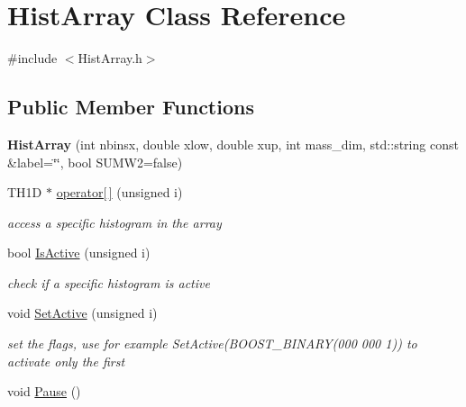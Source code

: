 \hypertarget{classHistArray}{\section{Hist\-Array Class Reference}
\label{classHistArray}
}


{\ttfamily \#include $<$Hist\-Array.\-h$>$}

\subsection*{Public Member Functions}
\begin{DoxyCompactItemize}
\item 
\hypertarget{classHistArray_a89bdf2f7fd395b479b92a4aad5973ef5}{{\bfseries Hist\-Array} (int nbinsx, double xlow, double xup, int mass\-\_\-dim, std\-::string const \&label=\char`\"{}\char`\"{}, bool S\-U\-M\-W2=false)}\label{classHistArray_a89bdf2f7fd395b479b92a4aad5973ef5}

\item 
T\-H1\-D $\ast$ \hyperlink{classHistArray_abfd450684a3cfda8cb0231b450e1c3ec}{operator\mbox{[}$\,$\mbox{]}} (unsigned i)
\begin{DoxyCompactList}\small\item\em access a specific histogram in the array \end{DoxyCompactList}\item 
\hypertarget{classHistArray_ab324fc243624240fe661ab18529f70c3}{bool \hyperlink{classHistArray_ab324fc243624240fe661ab18529f70c3}{Is\-Active} (unsigned i)}\label{classHistArray_ab324fc243624240fe661ab18529f70c3}

\begin{DoxyCompactList}\small\item\em check if a specific histogram is active \end{DoxyCompactList}\item 
\hypertarget{classHistArray_a5a83ba3fc0f0e30e41175d8a06bc24c3}{void \hyperlink{classHistArray_a5a83ba3fc0f0e30e41175d8a06bc24c3}{Set\-Active} (unsigned i)}\label{classHistArray_a5a83ba3fc0f0e30e41175d8a06bc24c3}

\begin{DoxyCompactList}\small\item\em set the flags, use for example Set\-Active(\-B\-O\-O\-S\-T\-\_\-\-B\-I\-N\-A\-R\-Y(000 000 1)) to activate only the first \end{DoxyCompactList}\item 
\hypertarget{classHistArray_a27f9acb7029ec4c90b4476e5bc26037d}{void \hyperlink{classHistArray_a27f9acb7029ec4c90b4476e5bc26037d}{Pause} ()}\label{classHistArray_a27f9acb7029ec4c90b4476e5bc26037d}


\end{DoxyCompactItemize}
